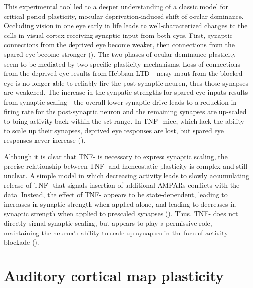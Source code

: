 This experimental tool led to a deeper understanding of a classic model for critical period plasticity, mocular deprivation-induced shift of ocular dominance. Occluding vision in one eye early in life leads to well-characterized changes to the cells in visual cortex receiving synaptic input from both eyes. First, synaptic connections from the deprived eye become weaker, then connections from the spared eye become stronger (\cite{Frenkel2004}). The two phases of ocular dominance plasticity seem to be mediated by two specific plasticity mechanisms. Loss of connections from the deprived eye results from Hebbian LTD---noisy input from the blocked eye is no longer able to reliably fire the post-synaptic neuron, thus those synapses are weakened. The increase in the synpatic strengths for spared eye inputs results from synaptic scaling---the overall lower synaptic drive leads to a reduction in firing rate for the post-synaptic neuron and the remaining synapses are up-scaled to bring activity back within the set range. In TNF-\textalpha{} mice, which lack the ability to scale up their synapses, deprived eye responses are lost, but spared eye responses never increase (\cite{Kaneko2008}).

Although it is clear that TNF-\textalpha{} is necessary to express synaptic scaling, the precise relationship between TNF-\textalpha{} and homeostatic plasticity is complex and still unclear. A simple model in which decreasing activity leads to slowly accumulating release of TNF-\textalpha{} that signals insertion of additional AMPARs conflicts with the data. Instead, the effect of TNF-\textalpha{} appears to be state-dependent, leading to increases in synaptic strength when applied alone, and leading to decreases in synaptic strength when applied to prescaled synapses (\cite{Steinmetz2010}). Thus, TNF-\textalpha{} does not directly signal synaptic scaling, but appears to play a permissive role, maintaining the neuron's ability to scale up synapses in the face of activity blockade (\cite{Steinmetz2010}).


\section{Auditory cortical map plasticity}

